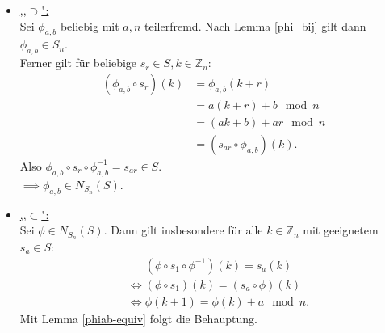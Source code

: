 \documentclass[a4paper]{article}
\newcommand{\Z}{\mathbb{Z}}
\begin{document}
    \begin{beweis}
        \begin{itemize}
            \item \underline{,,$\supset$":} \\
                Sei $\phi_{a,b}$ beliebig mit $a, n$ teilerfremd. Nach Lemma \ref{phi_bij} gilt dann $\phi_{a,b} \in S_n$.\\
        Ferner gilt für beliebige $s_r \in S, k \in \Z_n:$
        \begin{align*}
            (\phi_{a, b} \circ s_r)(k) &= \phi_{a, b}(k + r) \\
                                       &= a (k+r) + b \mod n \\
                                       &= (ak + b) + ar \mod n \\
                                       &= (s_{ar} \circ \phi_{a, b})(k)
        .\end{align*}
        Also $\phi_{a, b} \circ s_r \circ \phi_{a, b}^{-1} = s_{ar} \in S$. \\
        $\implies \phi_{a, b} \in N_{S_n}(S)$.

    \item \underline{,,$\subset $":} \\
        Sei $\phi \in N_{S_n}(S)$. Dann gilt insbesondere für alle $k \in \Z_n$ mit geeignetem $s_a \in S$:
        \begin{align*}
            &\phantom{\iff} (\phi \circ s_1 \circ \phi^{-1})(k) = s_a(k) \\
            &\iff (\phi \circ s_1)(k) = (s_a \circ \phi)(k) \\
            &\iff \phi(k+1) = \phi(k) + a \mod n
        .\end{align*}
        Mit Lemma \ref{phiab-equiv} folgt die Behauptung.   
    \end{itemize}
    \end{beweis}
\end{document}
